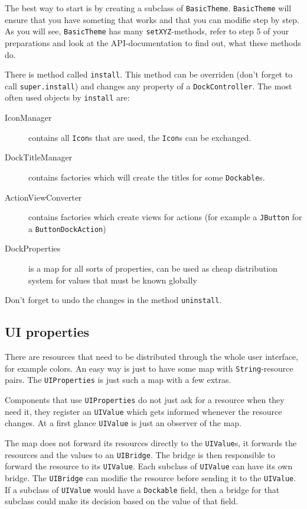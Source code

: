 \documentclass[a4paper,10pt]{article}
\newcommand{\src}[1]{\lstinline[basicstyle=\normalsize\ttfamily,keywordstyle=\normalsize\ttfamily,identifierstyle=\normalsize\ttfamily]|#1|}
\begin{document}
The best way to start is by creating a subclass of \src{BasicTheme}. \src{BasicTheme} will ensure that you have someting that works and that you can modifie step by step. As you will see, \src{BasicTheme} has many \src{setXYZ}-methods, refer to step 5 of your preparations and look at the API-documentation to find out, what these methods do.

There is method called \src{install}. This method can be overriden (don't forget to call \src{super.install}) and changes any property of a \src{DockController}. The most often used objects by \src{install} are:
\begin{description}
 \item[IconManager] contains all \src{Icon}s that are used, the \src{Icon}s can be exchanged.
 \item[DockTitleManager] contains factories which will create the titles for some \src{Dockable}s.
 \item[ActionViewConverter] contains factories which create views for actions (for example a \src{JButton} for a \src{ButtonDockAction})
 \item[DockProperties] is a map for all sorts of properties, can be used as cheap distribution system for values that must be known globally
\end{description}

Don't forget to undo the changes in the method \src{uninstall}.

\subsection{UI properties}
There are resources that need to be distributed through the whole user interface, for example colors. An easy way is just to have some map with \src{String}-resource pairs. The \src{UIProperties} is just such a map with a few extras.

Components that use \src{UIProperties} do not just ask for a resource when they need it, they register an \src{UIValue} which gets informed whenever the resource changes. At a first glance \src{UIValue} is just an observer of the map.

The map does not forward its resources directly to the \src{UIValue}s, it forwards the resources and the values to an \src{UIBridge}. The bridge is then responsible to forward the resource to its \src{UIValue}. Each subclass of \src{UIValue} can have its own bridge. The \src{UIBridge} can modifie the resource before sending it to the \src{UIValue}. If a subclass of \src{UIValue} would have a \src{Dockable} field, then a bridge for that subclass could make its decision based on the value of that field.
\end{document}
